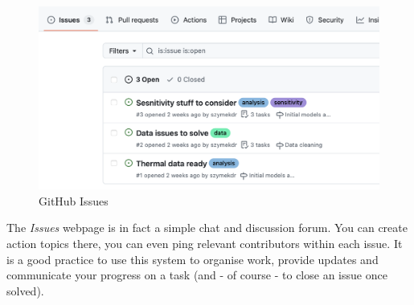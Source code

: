 \documentclass{tufte-handout}
\begin{document}
\begin{figure}
    \includegraphics[width=1\linewidth]{Zrzut ekranu 2024-12-23 o 10.07.30.png}
    \caption{GitHub Issues}
    \label{fig:issues}
\end{figure}

The \textit{Issues} webpage is in fact a simple chat and discussion forum. You can create action topics there, you can even ping relevant contributors within each issue. It is a good practice to use this system to organise work, provide updates and communicate your progress on a task (and - of course - to close an issue once solved).
\end{document}

